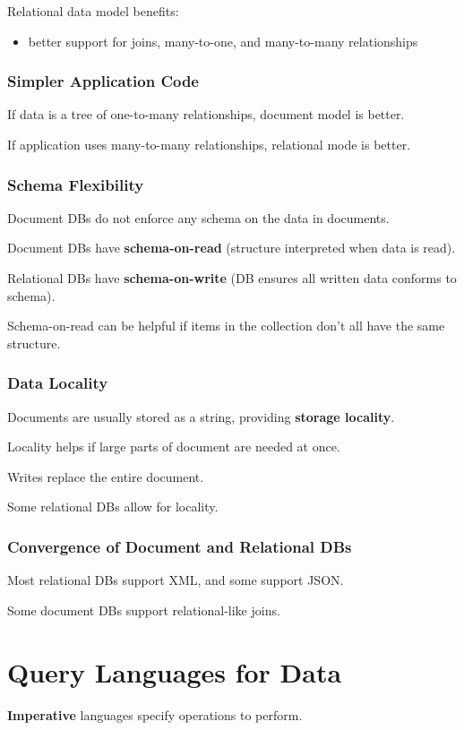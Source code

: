 \documentclass[11pt]{article}
\begin{document}
Relational data model benefits:
\begin{itemize}
\item better support for joins, many-to-one, and many-to-many
relationships
\end{itemize}
\subsubsection{Simpler Application Code}
\label{sec:org8791fd8}
If data is a tree of one-to-many relationships, document
model is better.

If application uses many-to-many relationships, relational mode
is better.
\subsubsection{Schema Flexibility}
\label{sec:org4f1ce9e}
Document DBs do not enforce any schema on the data in documents.

Document DBs have \textbf{schema-on-read} (structure interpreted when data
is read).

Relational DBs have \textbf{schema-on-write} (DB ensures all written data
conforms to schema).

Schema-on-read can be helpful if items in the collection don't all have
the same structure.
\subsubsection{Data Locality}
\label{sec:org749c650}
Documents are usually stored as a string, providing \textbf{storage locality}.

Locality helps if large parts of document are needed at once.

Writes replace the entire document.

Some relational DBs allow for locality.
\subsubsection{Convergence of Document and Relational DBs}
\label{sec:org1e4c5f6}
Most relational DBs support XML, and some support JSON.

Some document DBs support relational-like joins.
\section{Query Languages for Data}
\label{sec:org78c4843}
\textbf{Imperative} languages specify operations to perform.
\end{document}
